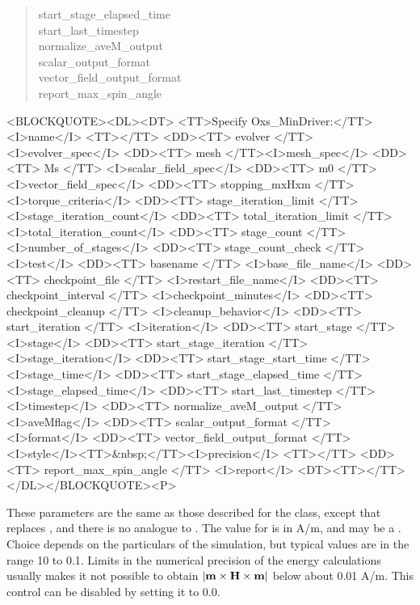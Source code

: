 \begin{description}
\begin{latexonly}
\begin{quote}
 \bi start\_stage\_elapsed\_time \\
 \bi start\_last\_timestep \\
 \bi normalize\_aveM\_output \\
 \bi scalar\_output\_format \\
 \bi vector\_field\_output\_format \ocb{}\ccb\\
 \bi report\_max\_spin\_angle \\
\ccb
\end{quote}
\end{latexonly}
\begin{rawhtml}<BLOCKQUOTE><DL><DT>
<TT>Specify Oxs_MinDriver:</TT><I>name</I> <TT>{</TT>
<DD><TT> evolver </TT><I>evolver_spec</I>
<DD><TT> mesh </TT><I>mesh_spec</I>
<DD><TT> Ms </TT> <I>scalar_field_spec</I>
<DD><TT> m0 </TT> <I>vector_field_spec</I>
<DD><TT> stopping_mxHxm </TT><I>torque_criteria</I>
<DD><TT> stage_iteration_limit </TT><I>stage_iteration_count</I>
<DD><TT> total_iteration_limit </TT><I>total_iteration_count</I>
<DD><TT> stage_count </TT><I>number_of_stages</I>
<DD><TT> stage_count_check </TT><I>test</I>
<DD><TT> basename </TT> <I>base_file_name</I>
<DD><TT> checkpoint_file </TT> <I>restart_file_name</I>
<DD><TT> checkpoint_interval </TT> <I>checkpoint_minutes</I>
<DD><TT> checkpoint_cleanup </TT> <I>cleanup_behavior</I>
<DD><TT> start_iteration </TT> <I>iteration</I>
<DD><TT> start_stage </TT> <I>stage</I>
<DD><TT> start_stage_iteration </TT> <I>stage_iteration</I>
<DD><TT> start_stage_start_time </TT> <I>stage_time</I>
<DD><TT> start_stage_elapsed_time </TT> <I>stage_elapsed_time</I>
<DD><TT> start_last_timestep </TT> <I>timestep</I>
<DD><TT> normalize_aveM_output </TT> <I>aveMflag</I>
<DD><TT> scalar_output_format </TT> <I>format</I>
<DD><TT> vector_field_output_format
       {</TT> <I>style</I><TT>&nbsp;</TT><I>precision</I> <TT>}</TT>
<DD><TT> report_max_spin_angle </TT> <I>report</I>
<DT><TT>}</TT></DL></BLOCKQUOTE><P>
\end{rawhtml}
These parameters are the same as those described for the
class, except that
 replaces , and there is no
analogue to .  The value for  is
in A/m, and may be a
.
Choice depends on the particulars of the simulation, but typical values
are in the range 10 to 0.1.  Limits in the numerical precision of the
energy calculations usually makes it not possible to obtain
$|\textbf{m}\times\textbf{H}\times\textbf{m}|$ below about 0.01 A/m.  This control can be
disabled by setting it to 0.0.


\end{description}
